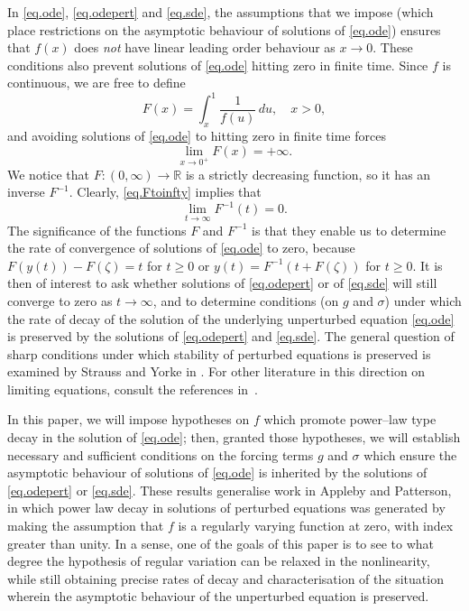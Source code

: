 \documentclass[a4paper,10pt,reqno]{amsart}
\numberwithin{equation}{section}
\theoremstyle{definition}
\theoremstyle{remark}
\DeclareMathOperator{\1}{\mathbbm 1}
\begin{document}
	In \eqref{eq.ode}, \eqref{eq.odepert} and \eqref{eq.sde}, the assumptions that we impose (which place restrictions on the asymptotic behaviour of solutions of \eqref{eq.ode}) ensures that $f(x)$ does \emph{not} have linear leading order behaviour as $x\to 0$. These conditions 
	also prevent solutions of \eqref{eq.ode} hitting zero in finite time. Since $f$ is continuous, we are free to define
	\begin{equation} \label{def.F}
		F(x)=\int_x^1 \frac{1}{f(u)}\,du, \quad x>0,
	\end{equation}
	and avoiding solutions of \eqref{eq.ode} to hitting zero in finite time forces
	\begin{equation} \label{eq.Ftoinfty}
		\lim_{x\to 0^+} F(x)=+\infty.
	\end{equation}
	We notice that $F:(0,\infty)\to\mathbb{R}$ is a strictly decreasing function, so it has an inverse $F^{-1}$. Clearly, \eqref{eq.Ftoinfty} implies that
	\[
	\lim_{t\to\infty} F^{-1}(t)=0.
	\]
	The significance of the functions $F$ and $F^{-1}$ is that they enable us to determine the rate of convergence of solutions of \eqref{eq.ode} to zero, because
	$F(y(t))-F(\zeta)=t$ for $t\geq 0$ or $y(t)=F^{-1}(t+F(\zeta))$ for $t\geq 0$. It is then of interest to ask whether solutions of \eqref{eq.odepert} or of 
	\eqref{eq.sde} will still converge to zero as $t\to\infty$, and to determine conditions (on $g$ and $\sigma$) under which the rate of decay of the solution of the underlying unperturbed equation \eqref{eq.ode} is preserved by the solutions of \eqref{eq.odepert} and \eqref{eq.sde}. The general question of sharp conditions under which stability of 
	perturbed equations  is preserved is examined by Strauss and Yorke in \cite{SY67,SY67b}. For other literature in this direction on limiting 
	equations, consult the references in~\cite{JAJC:2011szeged}.
	
	In this paper, we will impose hypotheses on $f$ which promote power--law type decay in the solution of \eqref{eq.ode}; then, granted those hypotheses, we will establish necessary and sufficient conditions on the forcing terms  $g$ and $\sigma$ which ensure the asymptotic behaviour of solutions of \eqref{eq.ode} is inherited by the solutions of \eqref{eq.odepert} or \eqref{eq.sde}. These results generalise work in Appleby and Patterson, in which power law decay in solutions of perturbed equations was generated by making the assumption that $f$ is a regularly varying function at zero, with index greater than unity. In a sense, one of the goals of this paper is to see to what degree the hypothesis of regular variation can be relaxed in the nonlinearity, while still obtaining precise rates of decay and characterisation of the situation wherein the asymptotic behaviour of the unperturbed equation is preserved. 
	
\end{document}
